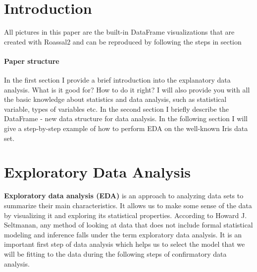 \documentclass{article}
\begin{document}
\begin{multicols}{2}
\section{Introduction}
\label{sec:intro}

%
%
%
%

All pictures in this paper are the built-in DataFrame visualizations that are created with Roassal2 and can be reproduced by following the steps in section \

\paragraph{Paper structure} In the first section I provide a brief introduction into the explanatory data analysis. What is it good for? How to do it right? I will also provide you with all the basic knowledge about statistics and data analysis, such as statistical variable, types of variables etc. In the second section I briefly describe the DataFrame - new data structure for data analysis. In the following section I will give a step-by-step example of how to perform EDA on the well-known Iris data set.





%
%
%
%

\section{Exploratory Data Analysis}
\label{sec:eda}
\textbf{Exploratory data analysis (EDA)} is an approach to analyzing data sets to summarize their main characteristics. It allows us to make some sense of the data by visualizing it and exploring its statistical properties. According to Howard J. Seltmanan, any method of looking at data that does not include formal statistical modeling and inference falls under the term exploratory data analysis\cite{Seltman}. It is an important first step of data analysis which helps us to select the model that we will be fitting to the data during the following steps of confirmatory data analysis.


\end{multicols}
\end{document}
